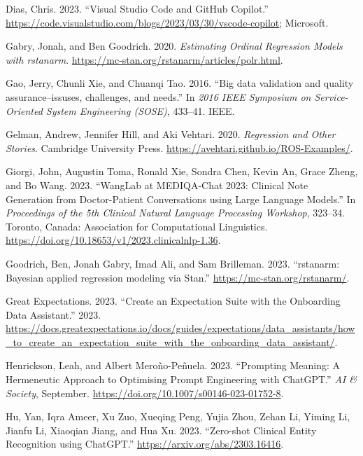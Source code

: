 \documentclass[
  letterpaper,
  DIV=11,
  numbers=noendperiod]{scrartcl}
\newlength{\cslhangindent}
\newlength{\cslentryspacingunit} %
\newenvironment{CSLReferences}[2] %
 {%
  \setlength{\parindent}{0pt}
  \ifodd #1
  \let\oldpar\par
  \def\par{\hangindent=\cslhangindent\oldpar}
  \fi
  \setlength{\parskip}{#2\cslentryspacingunit}
 }%
 {}
\begin{document}
\begin{CSLReferences}{1}{0}
\leavevmode{}%
Dias, Chris. 2023. {``{Visual Studio Code and GitHub Copilot}.''}
\url{https://code.visualstudio.com/blogs/2023/03/30/vscode-copilot};
Microsoft.

\leavevmode{}%
Gabry, Jonah, and Ben Goodrich. 2020. \emph{{Estimating Ordinal
Regression Models with rstanarm}}.
\url{https://mc-stan.org/rstanarm/articles/polr.html}.

\leavevmode{}%
Gao, Jerry, Chunli Xie, and Chuanqi Tao. 2016. {``{Big data validation
and quality assurance--issuses, challenges, and needs}.''} In \emph{2016
IEEE Symposium on Service-Oriented System Engineering (SOSE)}, 433--41.
IEEE.

\leavevmode{}%
Gelman, Andrew, Jennifer Hill, and Aki Vehtari. 2020. \emph{Regression
and Other Stories}. Cambridge University Press.
\url{https://avehtari.github.io/ROS-Examples/}.

\leavevmode{}%
Giorgi, John, Augustin Toma, Ronald Xie, Sondra Chen, Kevin An, Grace
Zheng, and Bo Wang. 2023. {``{WangLab at MEDIQA-Chat 2023: Clinical Note
Generation from Doctor-Patient Conversations using Large Language
Models}.''} In \emph{Proceedings of the 5th Clinical Natural Language
Processing Workshop}, 323--34. Toronto, Canada: Association for
Computational Linguistics.
\url{https://doi.org/10.18653/v1/2023.clinicalnlp-1.36}.

\leavevmode{}%
Goodrich, Ben, Jonah Gabry, Imad Ali, and Sam Brilleman. 2023.
{``{rstanarm: Bayesian applied regression modeling via Stan.}''}
\url{https://mc-stan.org/rstanarm/}.

\leavevmode{}%
Great Expectations. 2023. {``{Create an Expectation Suite with the
Onboarding Data Assistant}.''} 2023.
\url{https://docs.greatexpectations.io/docs/guides/expectations/data_assistants/how_to_create_an_expectation_suite_with_the_onboarding_data_assistant/}.

\leavevmode{}%
Henrickson, Leah, and Albert Meroño-Peñuela. 2023. {``{Prompting
Meaning: A Hermeneutic Approach to Optimising Prompt Engineering with
ChatGPT}.''} \emph{{AI \& Society}}, September.
\url{https://doi.org/10.1007/s00146-023-01752-8}.

\leavevmode{}%
Hu, Yan, Iqra Ameer, Xu Zuo, Xueqing Peng, Yujia Zhou, Zehan Li, Yiming
Li, Jianfu Li, Xiaoqian Jiang, and Hua Xu. 2023. {``{Zero-shot Clinical
Entity Recognition using ChatGPT}.''}
\url{https://arxiv.org/abs/2303.16416}.


\end{CSLReferences}
\end{document}

